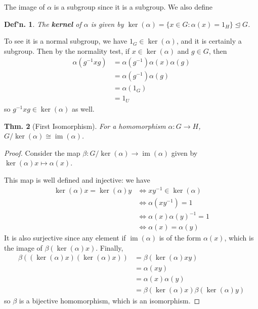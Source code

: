 \documentclass[12pt, a4paper]{book}
\DeclareMathOperator{\im}{im}
\newtheorem{theorem}{Thm.}[section]
\newtheorem{definition}[theorem]{Def'n.}
\theoremstyle{nonumberplain}
\newtheorem{proof}{Proof}
\begin{document}
The image of $\alpha$ is a subgroup since it is a subgroup.
We also define
\begin{definition}
    The \textbf{kernel} of $\alpha$ is given by $\ker(\alpha)=\{x\in G:\alpha(x)=1_H\}\trianglelefteq G$.
\end{definition}
To see it is a normal subgroup, we have $1_G\in\ker(\alpha)$, and it is certainly a subgroup.
Then by the normality test, if $x\in\ker(\alpha)$ and $g\in G$, then
\begin{align*}
    \alpha(g^{-1}xg)&=\alpha(g^{-1})\alpha(x)\alpha(g)\\
                    &= \alpha(g^{-1})\alpha(g)\\
                    &= \alpha(1_G)\\
                    &= 1_U
\end{align*}
so $g^{-1}xg\in\ker(\alpha)$ as well.
\begin{theorem}[First Isomorphism]
    For a homomorphism $\alpha:G\to H$, $G/\ker(\alpha)\cong\im(\alpha)$.
\end{theorem}
\begin{proof}
    Consider the map $\beta:G/\ker(\alpha)\to\im(\alpha)$ given by $\ker(\alpha)x\mapsto\alpha(x)$.
    
    This map is well defined and injective: we have
    \begin{align*}
        \ker(\alpha)x=\ker(\alpha)y &\Leftrightarrow xy^{-1}\in\ker(\alpha)\\
                                    &\Leftrightarrow \alpha(xy^{-1})=1\\
                                    &\Leftrightarrow\alpha(x)\alpha(y)^{-1}=1\\
                                    &\Leftrightarrow \alpha(x)=\alpha(y)
    \end{align*}
    It is also surjective since any element if $\im(\alpha)$ is of the form $\alpha(x)$, which is the image of $\beta(\ker(\alpha)x)$.
    Finally,
    \begin{align*}
        \beta( (\ker(\alpha)x)(\ker(\alpha)x) ) &= \beta(\ker(\alpha)xy)\\
                                                &= \alpha(xy)\\
                                                &= \alpha(x)\alpha(y)\\
                                                &= \beta(\ker(\alpha)x)\beta(\ker(\alpha)y)
    \end{align*}
    so $\beta$ is a bijective homomorphism, which is an isomorphism.
\end{proof}
\end{document}
